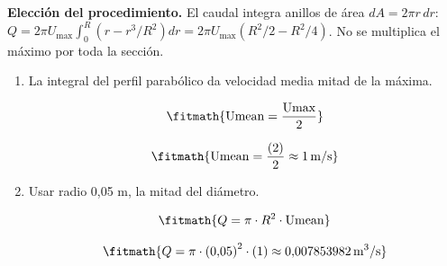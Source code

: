 \noindent\textbf{Elección del procedimiento.} El caudal integra anillos de área $dA=2\pi r\,dr$: $Q=2\pi U_{\max}\int_0^R(r-r^3/R^2)dr=2\pi U_{\max}(R^2/2-R^2/4)$. No se multiplica el máximo por toda la sección.

\begin{enumerate}

\item La integral del perfil parabólico da velocidad media mitad de la máxima.

\[\fitmath{\mathrm{Umean}=\frac{\mathrm{Umax}}{2}}\]

\[\fitmath{\mathrm{Umean}=\frac{(2)}{2}\approx 1\,\mathrm{m/s}}\]

\item Usar radio 0,05 m, la mitad del diámetro.

\[\fitmath{Q=\pi\cdot {R}^{2}\cdot \mathrm{Umean}}\]

\[\fitmath{Q=\pi\cdot {(0{,}05)}^{2}\cdot (1)\approx 0{,}007853982\,\mathrm{m^{3}/s}}\]

\end{enumerate}
